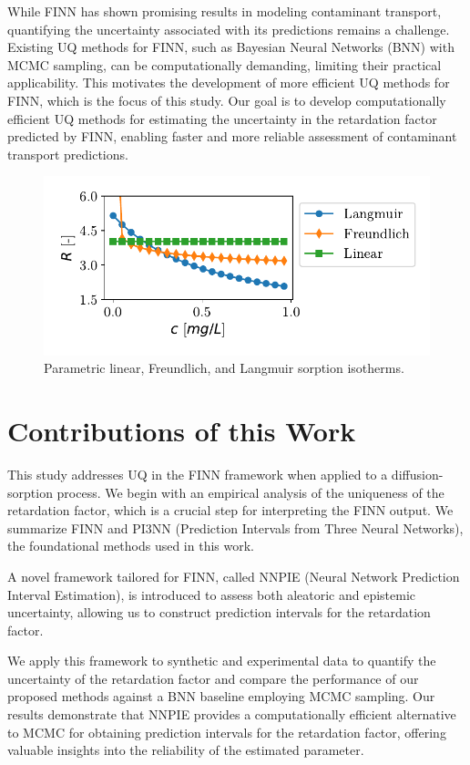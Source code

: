 While FINN has shown promising results in modeling contaminant transport, quantifying the uncertainty associated with its predictions remains a challenge. Existing UQ methods for FINN, such as Bayesian Neural Networks (BNN) with MCMC sampling, can be computationally demanding, limiting their practical applicability. This motivates the development of more efficient UQ methods for FINN, which is the focus of this study. Our goal is to develop computationally efficient UQ methods for estimating the uncertainty in the retardation factor predicted by FINN, enabling faster and more reliable assessment of contaminant transport predictions.

\begin{figure}[h]
    \centering
    \includegraphics{figs/parametric_isotherms.pdf}
    \caption{Parametric linear, Freundlich, and Langmuir sorption isotherms.}
    \label{fig:parametric_isotherms}
\end{figure}


\section{Contributions of this Work}
This study addresses UQ in the FINN framework when applied to a diffusion-sorption process. We begin with an empirical analysis of the uniqueness of the retardation factor, which is a crucial step for interpreting the FINN output. We summarize FINN and PI3NN (Prediction Intervals from Three Neural Networks), the foundational methods used in this work.

A novel framework tailored for FINN, called NNPIE (Neural Network Prediction Interval Estimation), is introduced to assess both aleatoric and epistemic uncertainty, allowing us to construct prediction intervals for the retardation factor.

We apply this framework to synthetic and experimental data to quantify the uncertainty of the retardation factor and compare the performance of our proposed methods against a BNN baseline employing MCMC sampling. Our results demonstrate that NNPIE provides a computationally efficient alternative to MCMC for obtaining prediction intervals for the retardation factor, offering valuable insights into the reliability of the estimated parameter.


